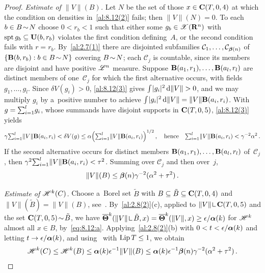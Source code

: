 \begin{proof}
    \emph{Estimate of $\|V\|(B)$.} Let $N$ be the set of those $x \in \mathbf{C} ( T, 0, 4 )$ at which
    the condition on densities in~\ref{al:8.12(2)} fails; then $\|V\|(N) = 0$. To each $b \in B
    \!\sim\! N$ choose $0 < r_b < 1$ such that either some $g_b \in \mathscr{X}(\mathbf{R}^{n})$ with $\operatorname{spt} g_b
    \subseteq \mathbf{U}(b,r_b)$ violates the first condition defining~$A$, or the second condition
    fails with $r = r_b$. By~\ref{al:2.7(1)} there are disjointed subfamilies $\mathcal{C}_1, \ldots,
    \mathcal{C}_{\boldsymbol{\beta}(n)}$ of $\{ \mathbf{B}(b,r_b) : b \in B \!\sim\! N \}$ covering $B
    \!\sim\! N$; each $\mathcal{C}_j$ is countable, since its members are disjoint and have
    positive $\mathscr{L}^{n}$ measure. Suppose $\mathbf{B}(a_1,r_1), \ldots, \mathbf{B}(a_l,r_l)$ are
    distinct members of one~$\mathcal{C}_j$ for which the first alternative occurs, with fields
    $g_1, \ldots, g_l$. Since $\delta V(g_i) > 0$, \ref{al:8.12(3)} gives ${\textstyle\int_{}^{}} |g_i|^2 \,\mathrm{d}
    \|V\| > 0$, and we may multiply $g_i$ by a~positive number to achieve ${\textstyle\int_{}^{}} |g_i|^2 \,\mathrm{d}
    \|V\| = \|V\| \mathbf{B}(a_i,r_i)$. With $g = {\textstyle\sum_{i=1}^{l}} g_i$, whose summands have disjoint
    supports in $\mathbf{C} ( T, 0, 5 )$, \ref{al:8.12(3)} yields
    \begin{displaymath}
        \gamma {\textstyle\sum_{i=1}^{l}} \|V\| \mathbf{B}(a_i,r_i) < \delta V(g) \le \alpha \Big(
        {\textstyle\sum_{i=1}^{l}} \|V\| \mathbf{B}(a_i,r_i) \Big)^{1/2} \,, \quad \text{hence} \quad
        {\textstyle\sum_{i=1}^{l}} \|V\| \mathbf{B}(a_i,r_i) < \gamma^{-2} \alpha^2 \,.
    \end{displaymath}
    If the second alternative occurs for distinct members $\mathbf{B}(a_1,r_1), \ldots,
    \mathbf{B}(a_l,r_l)$ of~$\mathcal{C}_j$, then $\gamma^2 {\textstyle\sum_{i=1}^{l}} \|V\| \mathbf{B}(a_i,r_i) <
    \tau^2$. Summing over $\mathcal{C}_j$ and then over~$j$,
    \begin{equation}
        \label{eq:8.12:11}
        \|V\|(B) \le \boldsymbol{\beta}(n) \gamma^{-2} (\alpha^2 + \tau^2) \,.
    \end{equation}

    \emph{Estimate of $\mathscr{H}^{k}(C)$.} Choose a~Borel set $\tilde B$ with $B \subseteq \tilde B
    \subseteq \mathbf{C} ( T, 0, 4 )$ and $\|V\|(\tilde B) = \|V\|(B)$, see~\cite[2.2.5]{Federer1969}.
    By~\ref{al:2.8(2)}(c), applied to $\|V\| \restrict \cylind{T}{0}{5}$ and the set
    $\mathbf{C} ( T, 0, 5 ) \!\sim\! \tilde B$, we have $\udensity^{\vdim}(\|V\| \restrict \tilde B, x) =
    \udensity^{\vdim}(\|V\|, x) \ge \epsilon / \unitmeasure{\vdim}$ for $\mathscr{H}^{k}$ almost all $x
    \in B$, by~\eqref{eq:8.12:a}. Applying~\ref{al:2.8(2)}(b) with $0 < t < \epsilon /
    \boldsymbol{\alpha}(k)$ and letting $t \to \epsilon / \boldsymbol{\alpha}(k)$, and
    using~\cite[2.10.11]{Federer1969} with $\operatorname{Lip} T \le 1$, we obtain
    \begin{equation}
        \label{eq:8.12:12}
        \mathscr{H}^{k}(C) \le \mathscr{H}^{k}(B) \le \boldsymbol{\alpha}(k) \epsilon^{-1} \|V\|(B) \le
        \boldsymbol{\alpha}(k) \epsilon^{-1} \boldsymbol{\beta}(n) \gamma^{-2} (\alpha^2 + \tau^2) \,.
    \end{equation}


\end{proof}
